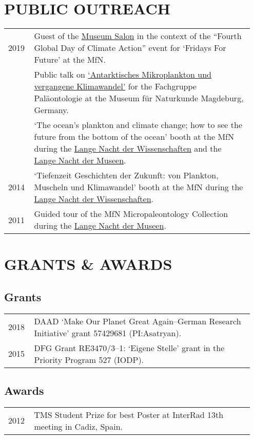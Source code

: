 \documentclass[11pt, a4paper]{article}
\begin{document}
\section{PUBLIC OUTREACH}
\begin{longtable}{p{0.1\linewidth} P{0.85\linewidth}}
2019 & Guest of the \href{https://www.museumfuernaturkunde.berlin/de/museum/veranstaltungen/aktionstag-zum-globalen-klimastreik-0}{Museum Salon} in the context of the ``Fourth Global Day of Climate Action'' event for `Fridays For Future' at the MfN.\\
 & Public talk on \href{http://www.naturkundemuseum-magdeburg.de/data/mediapool/qprgm004-2019-web.pdf}{`Antarktisches Mikroplankton und vergangene Klimawandel'} for the Fachgruppe Pal\"{a}ontologie at the Museum f\"{u}r Naturkunde Magdeburg, Germany.\\
 & `The ocean’s plankton and climate change; how to see the future from the bottom of the ocean' booth at the MfN during the \href{http://www.langenachtderwissenschaften.de/}{Lange Nacht der Wissenschaften} and the \href{http://www.lange-nacht-der-museen.de/}{Lange Nacht der Museen}.\\
2014 & `Tiefenzeit Geschichten der Zukunft: von Plankton, Muscheln und Klimawandel' booth at the MfN during the \href{http://www.langenachtderwissenschaften.de/}{Lange Nacht der Wissenschaften}.\\
2011 & Guided tour of the MfN Micropaleontology Collection during the \href{http://www.lange-nacht-der-museen.de/}{Lange Nacht der Museen}.\\
\end{longtable}

\section{GRANTS \& AWARDS}
\subsection{Grants}
\begin{longtable}{p{0.1\linewidth} P{0.85\linewidth}}
2018 & DAAD `Make Our Planet Great Again--German Research Initiative' grant 57429681 (PI:Asatryan).\\
2015 & DFG Grant RE3470/3--1: `Eigene Stelle' grant in the Priority Program 527 (IODP).\\
\end{longtable}
\subsection{Awards}
\begin{longtable}{p{0.1\linewidth} P{0.85\linewidth}}
2012 & TMS Student Prize for best Poster at InterRad 13th meeting in Cadiz, Spain.\\
\end{longtable}
\end{document}
